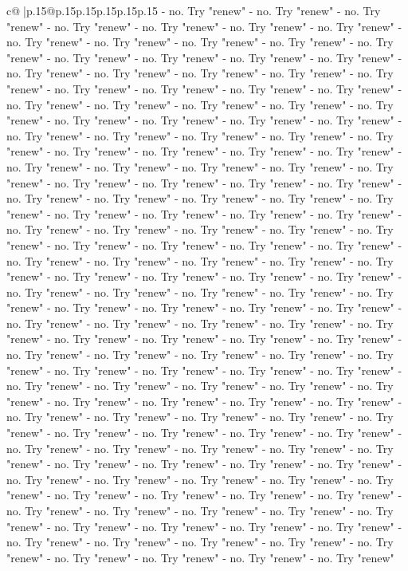\documentclass{article}
\begin{document}
{\begin{supertabular}{c@{$\;$}|p{.15\linewidth}@{}p{.15\linewidth}p{.15\linewidth}p{.15\linewidth}p{.15\linewidth}p{.15\linewidth}}
{{{{-} no. Try "renew" {-} no. Try "renew" {-} no. Try "renew" {-} no. Try "renew" {-} no. Try "renew" {-} no. Try "renew" {-} no. Try "renew" {-} no. Try "renew" {-} no. Try "renew" {-} no. Try "renew" {-} no. Try "renew" {-} no. Try "renew" {-} no. Try "renew" {-} no. Try "renew" {-} no. Try "renew" {-} no. Try "renew" {-} no. Try "renew" {-} no. Try "renew" {-} no. Try "renew" {-} no. Try "renew" {-} no. Try "renew" {-} no. Try "renew" {-} no. Try "renew" {-} no. Try "renew" {-} no. Try "renew" {-} no. Try "renew" {-} no. Try "renew" {-} no. Try "renew" {-} no. Try "renew" {-} no. Try "renew" {-} no. Try "renew" {-} no. Try "renew" {-} no. Try "renew" {-} no. Try "renew" {-} no. Try "renew" {-} no. Try "renew" {-} no. Try "renew" {-} no. Try "renew" {-} no. Try "renew" {-} no. Try "renew" {-} no. Try "renew" {-} no. Try "renew" {-} no. Try "renew" {-} no. Try "renew" {-} no. Try "renew" {-} no. Try "renew" {-} no. Try "renew" {-} no. Try "renew" {-} no. Try "renew" {-} no. Try "renew" {-} no. Try "renew" {-} no. Try "renew" {-} no. Try "renew" {-} no. Try "renew" {-} no. Try "renew" {-} no. Try "renew" {-} no. Try "renew" {-} no. Try "renew" {-} no. Try "renew" {-} no. Try "renew" {-} no. Try "renew" {-} no. Try "renew" {-} no. Try "renew" {-} no. Try "renew" {-} no. Try "renew" {-} no. Try "renew" {-} no. Try "renew" {-} no. Try "renew" {-} no. Try "renew" {-} no. Try "renew" {-} no. Try "renew" {-} no. Try "renew" {-} no. Try "renew" {-} no. Try "renew" {-} no. Try "renew" {-} no. Try "renew" {-} no. Try "renew" {-} no. Try "renew" {-} no. Try "renew" {-} no. Try "renew" {-} no. Try "renew" {-} no. Try "renew" {-} no. Try "renew" {-} no. Try "renew" {-} no. Try "renew" {-} no. Try "renew" {-} no. Try "renew" {-} no. Try "renew" {-} no. Try "renew" {-} no. Try "renew" {-} no. Try "renew" {-} no. Try "renew" {-} no. Try "renew" {-} no. Try "renew" {-} no. Try "renew" {-} no. Try "renew" {-} no. Try "renew" {-} no. Try "renew" {-} no. Try "renew" {-} no. Try "renew" {-} no. Try "renew" {-} no. Try "renew" {-} no. Try "renew" {-} no. Try "renew" {-} no. Try "renew" {-} no. Try "renew" {-} no. Try "renew" {-} no. Try "renew" {-} no. Try "renew" {-} no. Try "renew" {-} no. Try "renew" {-} no. Try "renew" {-} no. Try "renew" {-} no. Try "renew" {-} no. Try "renew" {-} no. Try "renew" {-} no. Try "renew" {-} no. Try "renew" {-} no. Try "renew" {-} no. Try "renew" {-} no. Try "renew" {-} no. Try "renew" {-} no. Try "renew" {-} no. Try "renew" {-} no. Try "renew" {-} no. Try "renew" {-} no. Try "renew" {-} no. Try "renew" {-} no. Try "renew" {-} no. Try "renew" {-} no. Try "renew" {-} no. Try "renew" {-} no. Try "renew" {-} no. Try "renew" {-} no. Try "renew" {-} no. Try "renew" {-} no. Try "renew" {-} no. Try "renew" {-} no. Try "renew" {-} no. Try "renew" {-} no. Try "renew" {-} no. Try "renew" {-} no. Try "renew" {-} no. Try "renew" {-} no. Try "renew" {-} no. Try "renew" {-} no. Try "renew" {-} no. Try "renew" {-} no. Try "renew" {-} no. Try "renew" {-} no. Try "renew" {-} no. Try "renew" {-} no. Try "renew" {-} no. Try "renew" {-} no. Try "renew" {-} no. Try "renew" {-} no. Try "renew" {-} no. Try "renew" {-} no. Try "renew" {-} no. Try "renew" }}}
\end{supertabular}}
\end{document}
